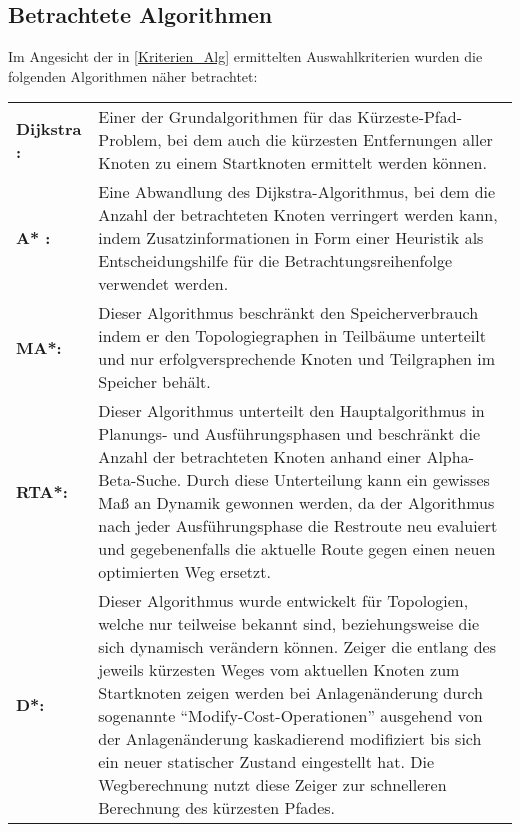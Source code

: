 	\subsection{Betrachtete Algorithmen}
		\label{Betrachtete_Algorithmen}
		Im Angesicht der in \ref{Kriterien_Alg} ermittelten Auswahlkriterien wurden die folgenden Algorithmen näher betrachtet:
		
		\begin{longtable}{p{2.5cm} p{10cm}}
			
			\textbf{Dijkstra :} & Einer der Grundalgorithmen für das Kürzeste-Pfad-Problem, bei dem auch die kürzesten Entfernungen aller Knoten zu einem Startknoten ermittelt werden können.\\[0.5cm]
			\textbf{A* :} & Eine Abwandlung des Dijkstra-Algorithmus, bei dem die Anzahl der betrachteten Knoten verringert werden kann, indem Zusatzinformationen in Form einer Heuristik als Entscheidungshilfe für die Betrachtungsreihenfolge verwendet werden.\\[0.5cm]
			\textbf{\ac{MA*}\cite{Chakrabarti1989}:} &	Dieser Algorithmus beschränkt den Speicherverbrauch indem er den Topologiegraphen in Teilbäume unterteilt und nur erfolgversprechende Knoten und Teilgraphen im Speicher behält.\\[0.5cm]
			\textbf{\ac{RTA*}\cite{Korf1990}:} & Dieser Algorithmus unterteilt den Hauptalgorithmus in  Planungs- und Ausführungsphasen und beschränkt die Anzahl der betrachteten Knoten anhand einer Alpha-Beta-Suche. Durch diese Unterteilung kann ein gewisses Maß an Dynamik gewonnen werden, da der Algorithmus nach jeder Ausführungsphase die Restroute neu evaluiert und gegebenenfalls die aktuelle Route gegen einen neuen optimierten Weg ersetzt.\\[0.5cm]
			\textbf{\ac{D*}\cite{DStarAlg}\cite{Koenig2005}:} & Dieser Algorithmus wurde entwickelt für Topologien, welche nur teilweise bekannt sind, beziehungsweise die sich dynamisch verändern können. Zeiger die entlang des jeweils kürzesten Weges vom aktuellen Knoten zum Startknoten zeigen werden bei Anlagenänderung durch sogenannte "`Modify-Cost-Operationen"' ausgehend von der Anlagenänderung kaskadierend modifiziert bis sich ein neuer statischer Zustand eingestellt hat. Die Wegberechnung nutzt diese Zeiger zur schnelleren Berechnung des kürzesten Pfades.\\[0.5cm]
			
		\end{longtable}
		
